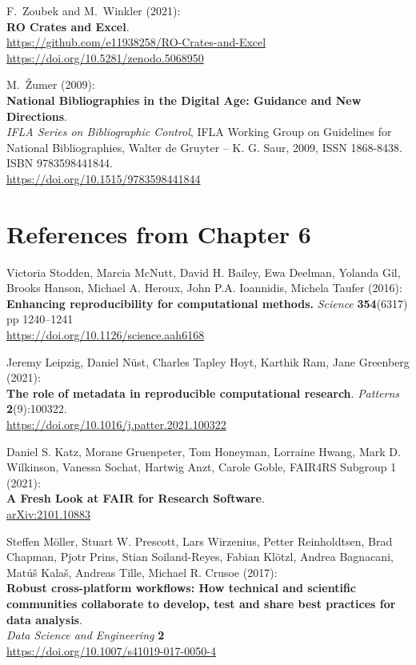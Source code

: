 \begin{thebibliography}{9}
F.~Zoubek and M.~Winkler (2021):\\
\textbf{RO Crates and Excel}.\\
\url{https://github.com/e11938258/RO-Crates-and-Excel}
\url{https://doi.org/10.5281/zenodo.5068950}

M.~Žumer (2009):\\
\textbf{National Bibliographies in the Digital Age: Guidance and New
Directions}.\\
\emph{IFLA Series on Bibliographic Control}, IFLA Working Group on
Guidelines for National Bibliographies, Walter de Gruyter -- K. G. Saur,
2009, ISSN 1868-8438. ISBN 9783598441844.\\
\url{https://doi.org/10.1515/9783598441844}


\section{References from Chapter 6}

Victoria Stodden, Marcia McNutt, David H. Bailey, Ewa Deelman,
Yolanda Gil, Brooks Hanson, Michael A. Heroux, John P.A. Ioannidis,
Michela Taufer (2016):\\
\textbf{Enhancing reproducibility for computational methods.}
\emph{Science} \textbf{354}(6317) pp 1240--1241\\
\url{https://doi.org/10.1126/science.aah6168}

Jeremy Leipzig, Daniel Nüst, Charles Tapley Hoyt, Karthik Ram,
Jane Greenberg (2021):\\
\textbf{The role of metadata in reproducible computational research}.
\emph{Patterns} \textbf{2}(9):100322.\\
\url{https://doi.org/10.1016/j.patter.2021.100322}

Daniel S. Katz, Morane Gruenpeter, Tom Honeyman, Lorraine Hwang,
Mark D. Wilkinson, Vanessa Sochat, Hartwig Anzt, Carole Goble, FAIR4RS
Subgroup 1 (2021):\\
\textbf{A Fresh Look at FAIR for Research Software}.\\
\href{https://arxiv.org/abs/2101.10883}{arXiv:2101.10883}

Steffen Möller, Stuart W. Prescott, Lars Wirzenius, Petter
Reinholdtsen, Brad Chapman, Pjotr Prins, Stian Soiland-Reyes, Fabian
Klötzl, Andrea Bagnacani, Matúš Kalaš, Andreas Tille, Michael R. Crusoe
(2017):\\
\textbf{Robust cross-platform workflows: How technical and scientific
communities collaborate to develop, test and share best practices for
data analysis}.\\
\emph{Data Science and Engineering} \textbf{2}\\
\url{https://doi.org/10.1007/s41019-017-0050-4}


\end{thebibliography}
